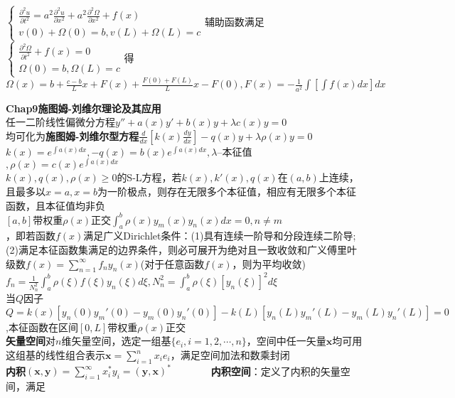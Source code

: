 \documentclass[10pt,a4paper]{article}
\begin{document}
\begin{multicols}{2}
\indent$\left\{\begin{array}{l}\frac{\partial^2u}{\partial t^2}=a^2\frac{\partial^2u}{\partial x^2}+a^2\frac{\partial^2\Omega}{\partial x^2}+f(x)\\v(0)+\Omega(0)=b,v(L)+\Omega(L)=c\end{array}\right.$辅助函数满足$\left\{\begin{array}{l}\frac{\partial^2\Omega}{\partial t^2}+f(x)=0\\\Omega(0)=b,\Omega(L)=c\end{array}\right.$得\\
\indent$\Omega(x)=b+\frac{c-b}{L}x+F(x)+\frac{F(0)+F(L)}{L}x-F(0),F(x)=-\frac{1}{a^2}\int[\int f(x)dx]dx$
\end{multicols}

\begin{multicols}{2}
\textbf{Chap9施图姆-刘维尔理论及其应用}\\
任一二阶线性偏微分方程$y''+a(x)y'+b(x)y+\lambda c(x)y=0$\\
均可化为\textbf{施图姆-刘维尔型方程}$\frac{d}{dx}[k(x)\frac{dy}{dx}]-q(x)y+\lambda \rho(x)y=0$\\
$k(x)=e^{\int a(x)dx},-q(x)=b(x)e^{\int a(x)dx},\lambda$--本征值$,\rho(x)=c(x)e^{\int a(x)dx}$\\
$k(x),q(x),\rho(x)\geq0$的S-L方程，若$k(x),k'(x),q(x)$在$(a,b)$上连续，且最多以$x=a,x=b$为一阶极点，则存在无限多个本征值，相应有无限多个本征函数，且本征值均非负\\
$[a,b]$带权重$\rho(x)$正交$\int_a^b\rho(x)y_m(x)y_n(x)dx=0,n\neq m$\\
，即若函数$f(x)$满足广义Dirichlet条件：(1)具有连续一阶导和分段连续二阶导;(2)满足本征函数集满足的边界条件，则必可展开为绝对且一致收敛和广义傅里叶级数$f(x)=\sum_{n=1}^{\infty}f_ny_n(x)$(对于任意函数$f(x)$，则为平均收敛)\\
\indent$f_n=\frac{1}{N_n^2}\int_a^b\rho(\xi)f(\xi)y_n(\xi)d\xi,N_n^2=\int_a^b\rho(\xi)[y_n(\xi)]^2d\xi$\scriptsize\\
当$Q$因子$Q=k(x)[y_n(0)y_m'(0)-y_m(0)y_n'(0)]-k(L)[y_n(L)y_m'(L)-y_m(L)y_n'(L)]=0$,本征函数在区间$[0,L]$带权重$\rho(x)$正交\\
\tiny\textbf{矢量空间}对$n$维矢量空间，选定一组基$\{e_i,i=1,2,\cdots,n\}$，空间中任一矢量$\bm{x}$均可用这组基的线性组合表示$\bm{x}=\sum_{i=1}^nx_ie_i$，满足空间加法和数乘封闭\\
\textbf{内积}$(\bm{x},\bm{y})=\sum_{i=1}^{\infty}x_i^*y_i=(\bm{y},\bm{x})^*$~~~~~~~~\textbf{内积空间}：定义了内积的矢量空间，满足\\

\end{multicols}
\end{document}
